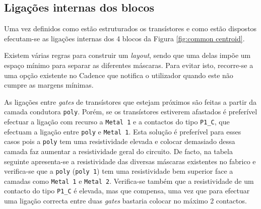 \documentclass[11pt]{article}
\numberwithin{equation}{section}
\begin{document}
 

 

\subsection{Ligações internas dos blocos}

Uma vez definidos como estão estruturados os transístores e como estão dispostos efecutam-se as ligações internas dos 4 blocos da Figura \ref{fig:common centroid}.

Existem várias regras para construir um \textit{layout}, sendo que uma delas impõe um espaço mínimo para separar as diferentes máscaras. Para evitar isto, recorre-se a uma opção existente no Cadence que notifica o utilizador quando este não cumpre as margens mínimas. 

As ligações entre \textit{gates} de transístores que estejam próximos são feitas a partir da camada condutora \texttt{poly}. Porém, se os transístores estiverem afastados é preferível efectuar a ligação com recurso a \texttt{Metal 1} e a contactos do tipo \texttt{P1\_C}, que efectuam a ligação entre \texttt{poly} e \texttt{Metal 1}. Esta solução é preferível para esses casos pois a \texttt{poly} tem uma resistividade elevada e colocar demasiado dessa camada faz aumentar a resistividade geral do circuito. De facto, na tabela seguinte apresenta-se a resistividade das diversas máscaras existentes no fabrico e verifica-se que a \texttt{poly} (\texttt{poly 1}) tem uma resistividade bem superior face a camadas como \texttt{Metal 1} e \texttt{Metal 2}. Verifica-se também que a resistividade de um contacto do tipo \texttt{P1\_C} é elevada, mas que compensa, uma vez que para efectuar uma ligação correcta entre duas \textit{gates} bastaria colocar no máximo 2 contactos.
\end{document}

